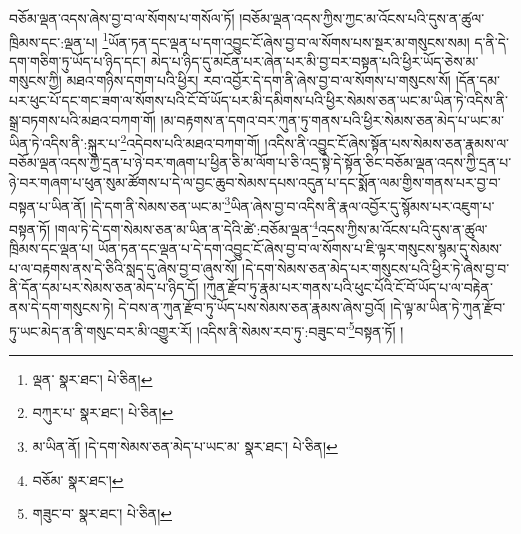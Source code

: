 བཅོམ་ལྡན་འདས་ཞེས་བྱ་བ་ལ་སོགས་པ་གསོལ་ཏོ། །བཅོམ་ལྡན་འདས་ཀྱིས་ཀྱང་མ་འོངས་པའི་དུས་ན་ཚུལ་ཁྲིམས་དང་:ལྡན་པ། \footnote{ལྡན་  སྣར་ཐང་།  པེ་ཅིན། }ཡོན་ཏན་དང་ལྡན་པ་དག་འབྱུང་ངོ་ཞེས་བྱ་བ་ལ་སོགས་པས་སྔར་མ་གསུངས་སམ། ད་ནི་དེ་དག་གཅིག་ཏུ་ཡོད་པ་ཉིད་དང་། མེད་པ་ཉིད་དུ་མངོན་པར་ཞེན་པར་མི་བྱ་བར་བསྟན་པའི་ཕྱིར་ཡོད་ཅེས་མ་གསུངས་ཀྱི། མཐའ་གཉིས་དགག་པའི་ཕྱིར། རབ་འབྱོར་དེ་དག་ནི་ཞེས་བྱ་བ་ལ་སོགས་པ་གསུངས་སོ། །དོན་དམ་པར་ཕུང་པོ་དང་གང་ཟག་ལ་སོགས་པའི་ངོ་བོ་ཡོད་པར་མི་དམིགས་པའི་ཕྱིར་སེམས་ཅན་ཡང་མ་ཡིན་ཏེ་འདིས་ནི་སྒྲ་བཏགས་པའི་མཐའ་བཀག་གོ། །མ་བརྟགས་ན་དགའ་བར་ཀུན་ཏུ་གནས་པའི་ཕྱིར་སེམས་ཅན་མེད་པ་ཡང་མ་ཡིན་ཏེ་འདིས་ནི་:སྐུར་པ་\footnote{བཀུར་པ་  སྣར་ཐང་།  པེ་ཅིན། }འདེབས་པའི་མཐའ་བཀག་གོ། །འདིས་ནི་འབྱུང་ངོ་ཞེས་སྟོན་པས་སེམས་ཅན་རྣམས་ལ་བཅོམ་ལྡན་འདས་ཀྱི་དྲན་པ་ཉེ་བར་གཞག་པ་ཕྱིན་ཅི་མ་ལོག་པ་ཅི་འདྲ་སྟེ་དེ་སྟོན་ཅིང་བཅོམ་ལྡན་འདས་ཀྱི་དྲན་པ་ཉེ་བར་གཞག་པ་ཕུན་སུམ་ཚོགས་པ་དེ་ལ་བྱང་ཆུབ་སེམས་དཔས་འདུན་པ་དང་སྨོན་ལམ་གྱིས་གནས་པར་བྱ་བ་བསྟན་པ་ཡིན་ནོ། །དེ་དག་ནི་སེམས་ཅན་ཡང་མ་\footnote{མ་ཡིན་ནོ། །དེ་དག་སེམས་ཅན་མེད་པ་ཡང་མ་  སྣར་ཐང་།  པེ་ཅིན། }ཡིན་ཞེས་བྱ་བ་འདིས་ནི་རྣལ་འབྱོར་དུ་སྙོམས་པར་འཇུག་པ་བསྟན་ཏོ། །གལ་ཏེ་དེ་དག་སེམས་ཅན་མ་ཡིན་ན་དེའི་ཚེ་:བཅོམ་ལྡན་\footnote{བཅོམ་  སྣར་ཐང་། }འདས་ཀྱིས་མ་འོངས་པའི་དུས་ན་ཚུལ་ཁྲིམས་དང་ལྡན་པ། ཡོན་ཏན་དང་ལྡན་པ་དེ་དག་འབྱུང་ངོ་ཞེས་བྱ་བ་ལ་སོགས་པ་ཇི་ལྟར་གསུངས་སྙམ་དུ་སེམས་པ་ལ་བརྟགས་ནས་དེ་ཅིའི་སླད་དུ་ཞེས་བྱ་བ་ཞུས་སོ། །དེ་དག་སེམས་ཅན་མེད་པར་གསུངས་པའི་ཕྱིར་ཏེ་ཞེས་བྱ་བ་ནི་དོན་དམ་པར་སེམས་ཅན་མེད་པ་ཉིད་དོ། །ཀུན་རྫོབ་ཏུ་རྣམ་པར་གནས་པའི་ཕུང་པོའི་ངོ་བོ་ཡོད་པ་ལ་བརྟེན་ནས་དེ་དག་གསུངས་ཏེ། དེ་བས་ན་ཀུན་རྫོབ་ཏུ་ཡོད་པས་སེམས་ཅན་རྣམས་ཞེས་བྱའོ། །དེ་ལྟ་མ་ཡིན་ཏེ་ཀུན་རྫོབ་ཏུ་ཡང་མེད་ན་ནི་གསུང་བར་མི་འགྱུར་རོ། །འདིས་ནི་སེམས་རབ་ཏུ་:བཟུང་བ་\footnote{གཟུང་བ་  སྣར་ཐང་།  པེ་ཅིན། }བསྟན་ཏོ། །
